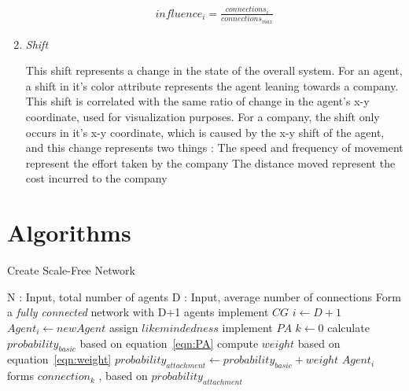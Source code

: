 \begin{enumerate}
\begin{eqnarray}
influence_{i} = \frac{connections_i}{connections_{max}} 
\label{eqn:influence} 
\end{eqnarray}

\item \emph{Shift}

This shift represents a change in the state of the overall system. For an agent, a shift in it's color attribute represents the agent leaning towards a company. This shift is correlated with the same ratio of change in the agent's x-y coordinate, used for visualization purposes.
For a company, the shift only occurs in it's x-y coordinate, which is caused by the x-y shift of the agent, and this change represents two things : 
\subitem[a] The speed and frequency of movement represent the effort taken by the company
\subitem[b] The distance moved represent the cost incurred to the company
\end{enumerate}

\clearpage

\section{Algorithms}

\begin{algorithm}
\caption{Create Scale-Free Network}
\label{ag1}
\begin{algorithmic}
\STATE N : Input, total number of agents
\STATE D : Input, average number of connections
	\STATE Form a \emph{fully connected} network with D+1 agents
\ENDIF 
\STATE implement $CG$
\STATE $i \gets D+1$
	\STATE $Agent_i \gets newAgent$
	\STATE assign $likemindedness$ 
	\STATE implement $PA$
	\STATE $k \gets 0$
		\STATE calculate $probability_{basic}$ based on equation~\ref{eqn:PA}
		\STATE compute $weight$ based on equation~\ref{eqn:weight} 
		\STATE $probability_{attachment} \gets  probability_{basic} + weight$ 
		\STATE $Agent_i$ forms $connection_k$ , based on $probability_{attachment}$
	\ENDWHILE	
\ENDWHILE
\end{algorithmic}
\end{algorithm}

\clearpage

